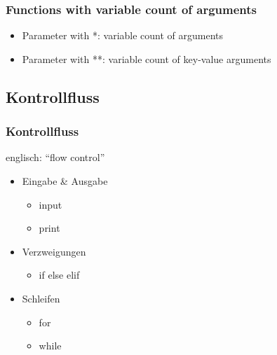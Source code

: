 \documentclass[ngerman]{beamer}
\newcommand{\ta}[1]{\textattachfile[color=1 0 0]{#1}{Code}}
\begin{document}
\begin{frame}
\frametitle{Functions with variable count of arguments}

\begin{itemize}
\item Parameter with *: variable count of arguments
\item Parameter with **: variable count of key-value arguments
\end{itemize}





\end{frame}




\subsection{Kontrollfluss}

\begin{frame}
\frametitle{Kontrollfluss}

englisch: \enquote{flow control}

\begin{itemize}
\item Eingabe \& Ausgabe
\begin{itemize}
	\item input
	\item print
\end{itemize}

\item Verzweigungen
\begin{itemize}
	\item if else elif
\end{itemize}

\item Schleifen
\begin{itemize}
	\item for
	\item while
\end{itemize}

\end{itemize}
\end{frame}

%
\end{document}
